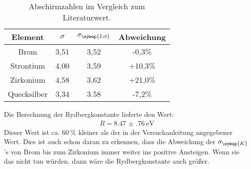 \begin{table}[H]
  \centering
  \caption{Abschirmzahlen im Vergleich zum Literaturwert.}
    \begin{tabular}{c c c c}
    \toprule
    Element & $\sigma$ & $\sigma_\symup{Lit}$ & Abweichung\\
    \midrule
    Brom & 3,51 & 3,52 & -0,3\% \\
    Strontium & 4,00 & 3,59 & +10,3\% \\
    Zirkonium & 4,58 & 3,62 & +21,0\% \\
    Quecksilber & 3,34 & 3.58 & -7,2\% \\
    \bottomrule
  \end{tabular}
  \label{tab:sigma_lit}
\end{table}

Die Berechnung der Rydbergkonstante lieferte den Wert:
\begin{align*}
  R = \SI{8.47(76)}{\eV}
\end{align*}
Dieser Wert ist ca. $\SI{60}{\percent}$ kleiner als der in der Versuchanleitung angegebener
Wert. Dies ist auch schon daran zu erkennen, dass die Abweichung der $\sigma_\symup{K}$'s
von Brom bis zum Zirkonium immer weiter ins positive Ansteigen. Wenn sie das nicht tun
würden, dann wäre die Rydbergkonstante auch größer.
\nocite{sample}
\nocite{alpha}
